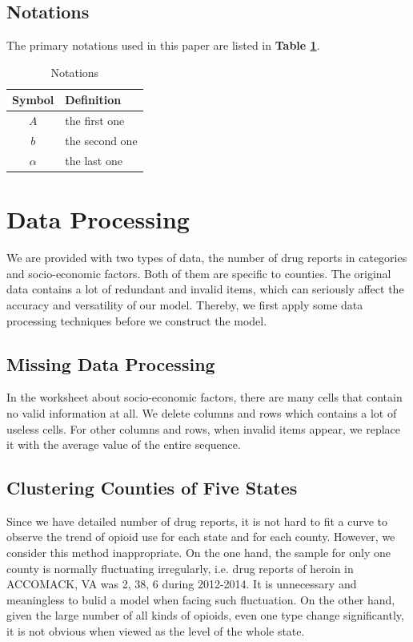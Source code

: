 \documentclass[11pt]{article}
\begin{document}
\subsection{Notations}
The primary notations used in this paper are listed in \textbf{Table \ref{tb:notation}}.
\begin{table}[!htbp]
\begin{center}
\caption{Notations}
\begin{tabular}{cl}
	\toprule
	\multicolumn{1}{m{3cm}}{\centering Symbol}
	&\multicolumn{1}{m{8cm}}{\centering Definition}\\
	\midrule
	$A$&the first one\\
	$b$&the second one\\
	$\alpha$ &the last one\\
	\bottomrule
\end{tabular}\label{tb:notation}
\end{center}
\end{table}

\section{Data Processing}
We are provided with two types of data, the number of drug reports in categories and socio-economic factors. Both of them are specific to counties. The original data contains a lot of redundant and invalid items, which can seriously affect the accuracy and versatility of our model. Thereby, we first apply some data processing techniques before we construct the model.
\subsection{Missing Data Processing}
In the worksheet about socio-economic factors, there are many cells that contain no valid information at all. We delete columns and rows which contains a lot of useless cells. For other columns and rows, when invalid items appear, we replace it with the average value of the entire sequence.

\subsection{Clustering Counties of Five States}
Since we have detailed number of drug reports, it is not hard to fit a curve to observe the trend of opioid use for each state and for each county. However, we consider this method inappropriate. On the one hand, the sample for only one county is normally fluctuating irregularly, i.e. drug reports of heroin in ACCOMACK, VA was 2, 38, 6 during 2012-2014. It is unnecessary and meaningless to bulid a model when facing such fluctuation. On the other hand, given the large number of all kinds of opioids, even one type change significantly, it is not obvious when viewed as the level of the whole state.
\end{document}
